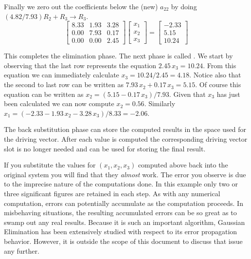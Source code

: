 Finally we zero out the coefficients below the (new) $a_{22}$ by doing $(4.82/7.93)R_2 + R_3
\rightarrow R_3$.
\begin{displaymath}
\left[
\begin{array}{rrr}
 8.33 & 1.93 & 3.28 \\
 0.00 & 7.93 & 0.17 \\
 0.00 & 0.00 & 2.45
\end{array}
\right]
\left[
\begin{array}{ccc}
x_1 \\
x_2 \\
x_3
\end{array}
\right] =
\left[
\begin{array}{rrr}
 -2.33 \\
  5.15 \\
 10.24
\end{array}
\right]
\end{displaymath}

This completes the elimination phase. The next phase is called . We
start by observing that the last row represents the equation $2.45\,x_3 = 10.24$. From this
equation we can immediately calculate $x_3 = 10.24/2.45 = 4.18$. Notice also that the second to
last row can be written as $7.93\,x_2 + 0.17\,x_3 = 5.15$. Of course this equation can be
written as $x_2 = (5.15 - 0.17\,x_3)/7.93$. Given that $x_3$ has just been calculated we can now
compute $x_2 = 0.56$. Similarly $x_1 = (-2.33 - 1.93\,x_2 - 3.28\,x_3)/8.33 = -2.06$.

The back substitution phase can store the computed results in the space used for the driving
vector. After each value is computed the corresponding driving vector slot is no longer needed
and can be used for storing the final result.

If you substitute the values for $(x_1, x_2, x_3)$ computed above back into the original system
you will find that they \emph{almost} work. The error you observe is due to the imprecise nature
of the computations done. In this example only two or three significant figures are retained in
each step. As with any numerical computation, errors can potentially accumulate as the
computation proceeds. In misbehaving situations, the resulting accumulated errors can be so
great as to swamp out any real results. Because it is such an important algorithm, Gaussian
Elimination has been extensively studied with respect to its error propagation behavior.
However, it is outside the scope of this document to discuss that issue any further.

